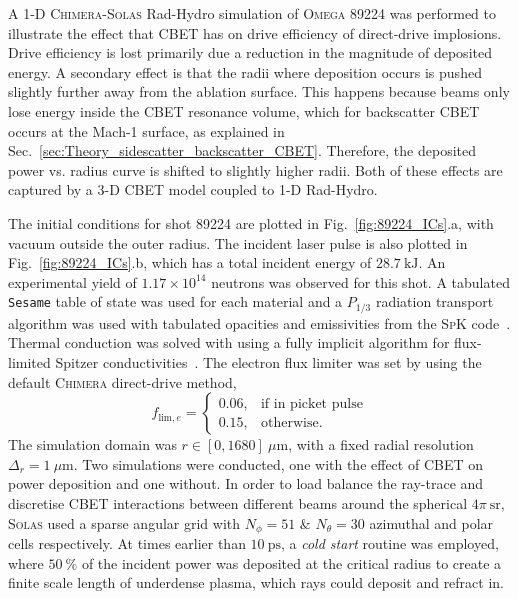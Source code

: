 A 1-D \textsc{Chimera}-\textsc{Solas} \ac{Rad-Hydro} simulation of \textsc{Omega} 89224 was performed to illustrate the effect that \ac{CBET} has on drive efficiency of direct-drive implosions.
Drive efficiency is lost primarily due a reduction in the magnitude of deposited energy.
A secondary effect is that the radii where deposition occurs is pushed slightly further away from the ablation surface.
This happens because beams only lose energy inside the \ac{CBET} resonance volume, which for backscatter \ac{CBET} occurs at the Mach-1 surface, as explained in Sec.~\ref{sec:Theory_sidescatter_backscatter_CBET}.
Therefore, the deposited power vs. radius curve is shifted to slightly higher radii.
Both of these effects are captured by a 3-D \ac{CBET} model coupled to 1-D \ac{Rad-Hydro}.

The initial conditions for shot 89224 are plotted in Fig.~\ref{fig:89224_ICs}.a, with vacuum outside the outer radius.
The incident laser pulse is also plotted in Fig.~\ref{fig:89224_ICs}.b, which has a total incident energy of $28.7\  \text{kJ}$.
An experimental yield of $1.17\times 10^{14}$ neutrons was observed for this shot.
A tabulated \texttt{Sesame} table of state was used for each material \cite{mchardy_introduction_2018} and a $P_{1/3}$ radiation transport algorithm was used with tabulated opacities and emissivities from the \textsc{SpK} code~\cite{crilly_spk_2023}.
Thermal conduction was solved with using a fully implicit algorithm for flux-limited Spitzer conductivities~\cite{spitzer_transport_1953}.
The electron flux limiter was set by using the default \textsc{Chimera} direct-drive method,
\begin{equation}
    \label{eq:SOLAS_flime}
    f_{\text{lim},e} = 
    \begin{cases}
        0.06, & \text{if in picket pulse}\\
        0.15, & \text{otherwise}.
    \end{cases}
\end{equation}
The simulation domain was $r\in [0,1680]\ \mu\text{m}$, with a fixed radial resolution $\Delta_r = 1\ \mu\text{m}$.
Two simulations were conducted, one with the effect of \ac{CBET} on power deposition and one without.
In order to load balance the ray-trace and discretise \ac{CBET} interactions between different beams around the spherical $4\pi\ \text{sr}$, \textsc{Solas} used a sparse angular grid with $N_{\phi}=51$ \& $N_{\theta}=30$ azimuthal and polar cells respectively.
At times earlier than $10\ \text{ps}$, a \textit{cold start} routine was employed, where $50\ \%$ of the incident power was deposited at the critical radius to create a finite scale length of underdense plasma, which rays could deposit and refract in.
